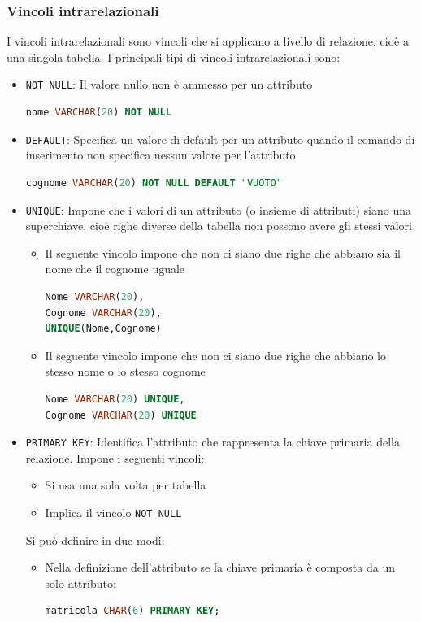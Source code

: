\documentclass[a4paper]{article}
\begin{document}
\subsubsection{Vincoli intrarelazionali}
I vincoli intrarelazionali sono vincoli che si applicano a livello di relazione, cioè a
una singola tabella. I principali tipi di vincoli intrarelazionali sono:
\begin{itemize}
  \item \texttt{NOT NULL}: Il valore nullo non è ammesso per un attributo
\begin{lstlisting}[language=SQL, numbers=none]
nome VARCHAR(20) NOT NULL
\end{lstlisting}


  \item \texttt{DEFAULT}: Specifica un valore di default per un attributo quando
    il comando di inserimento non specifica nessun valore per l'attributo

\begin{lstlisting}[language=SQL, numbers=none]
cognome VARCHAR(20) NOT NULL DEFAULT "VUOTO"
\end{lstlisting}

  \item \texttt{UNIQUE}: Impone che i valori di un attributo (o insieme di attributi)
    siano una superchiave, cioè righe diverse della tabella non possono avere gli stessi
    valori

    \begin{itemize}
      \item 
        Il seguente vincolo impone che non ci siano due righe che abbiano sia il nome
        che il cognome uguale
\begin{lstlisting}[language=SQL]
Nome VARCHAR(20),
Cognome VARCHAR(20),
UNIQUE(Nome,Cognome)
\end{lstlisting}

    \item 
      Il seguente vincolo impone che non ci siano due righe che abbiano lo stesso
      nome o lo stesso cognome
\begin{lstlisting}[language=SQL]
Nome VARCHAR(20) UNIQUE,
Cognome VARCHAR(20) UNIQUE
\end{lstlisting}
    \end{itemize}

  \item \texttt{PRIMARY KEY}: Identifica l'attributo che rappresenta la chiave primaria
    della relazione. Impone i seguenti vincoli:
    \begin{itemize}
      \item Si usa una sola volta per tabella
      \item Implica il vincolo \texttt{NOT NULL}
    \end{itemize}
    Si può definire in due modi:
    \begin{itemize}
      \item Nella definizione dell'attributo se la chiave primaria è composta da un
        solo attributo:
\begin{lstlisting}[language=SQL, numbers=none]
matricola CHAR(6) PRIMARY KEY;
\end{lstlisting}


\end{itemize}
\end{itemize}
\end{document}
